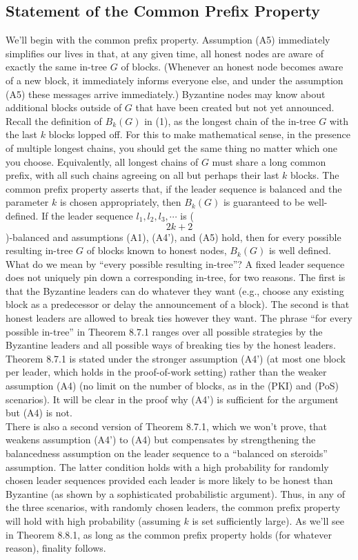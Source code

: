 \subsection{Statement of the Common Prefix Property}
We’ll begin with the common prefix property. Assumption (A5) immediately simplifies our
lives in that, at any given time, all honest nodes are aware of exactly the same in-tree $G$ of
blocks. (Whenever an honest node becomes aware of a new block, it immediately informs
everyone else, and under the assumption (A5) these messages arrive immediately.) Byzantine
nodes may know about additional blocks outside of $G$ that have been created but not yet
announced.\\
Recall the definition of $B_k(G)$ in (1), as the longest chain of the in-tree $G$ with the last $k$
blocks lopped off. For this to make mathematical sense, in the presence of multiple longest
chains, you should get the same thing no matter which one you choose. Equivalently, all
longest chains of $G$ must share a long common prefix, with all such chains agreeing on all but
perhaps their last $k$ blocks. The common prefix property asserts that, if the leader sequence
is balanced and the parameter $k$ is chosen appropriately, then $B_k(G)$ is guaranteed to be well-defined.
 {If the leader
sequence $l_1, l_2, l_3, \cdots$ is ($$2k + 2$$)-balanced and assumptions (A1), (A4’), and (A5) hold, then
for every possible resulting in-tree $G$ of blocks known to honest nodes, $B_k(G)$ is well defined.}
What do we mean by “every possible resulting in-tree”? A fixed leader sequence does not
uniquely pin down a corresponding in-tree, for two reasons. The first is that the Byzantine
leaders can do whatever they want (e.g., choose any existing block as a predecessor or delay
the announcement of a block). The second is that honest leaders are allowed to break
ties however they want. The phrase “for every possible in-tree” in Theorem 8.7.1 ranges over all possible strategies by the Byzantine leaders and all possible ways of breaking ties by the
honest leaders.\\

Theorem 8.7.1 is stated under the stronger assumption (A4’) (at most one block per leader, which holds in the proof-of-work setting) rather than
the weaker assumption (A4) (no limit on the number of blocks, as in the (PKI) and (PoS)
scenarios). It will be clear in the proof why (A4’) is sufficient for the argument but (A4) is
not.\\
There is also a second version of Theorem 8.7.1, which we won’t prove, that weakens
assumption (A4’) to (A4) but compensates by strengthening the balancedness assumption
on the leader sequence to a “balanced on steroids” assumption. The latter condition holds
with a high probability for randomly chosen leader sequences provided each leader is more likely
to be honest than Byzantine (as shown by a sophisticated probabilistic argument). Thus,
in any of the three scenarios, with randomly chosen leaders, the common prefix property will
hold with high probability (assuming $k$ is set sufficiently large). As we’ll see in Theorem 8.8.1,
as long as the common prefix property holds (for whatever reason), finality follows.
